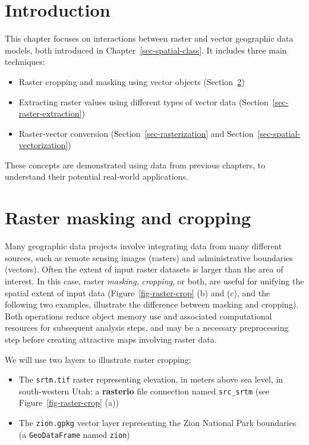 \documentclass[
  letterpaper,
]{krantz}
\providecommand{\tightlist}{%
  \setlength{\itemsep}{0pt}\setlength{\parskip}{0pt}}\usepackage{longtable,booktabs,array}
\begin{document}
\section{Introduction}\label{introduction-4}

This chapter focuses on interactions between raster and vector
geographic data models, both introduced in
Chapter~\ref{sec-spatial-class}. It includes three main techniques:

\begin{itemize}
\tightlist
\item
  Raster cropping and masking using vector objects
  (Section~\ref{sec-raster-cropping})
\item
  Extracting raster values using different types of vector data
  (Section~\ref{sec-raster-extraction})
\item
  Raster-vector conversion (Section~\ref{sec-rasterization} and
  Section~\ref{sec-spatial-vectorization})
\end{itemize}

These concepts are demonstrated using data from previous chapters, to
understand their potential real-world applications.

\section{Raster masking and cropping}\label{sec-raster-cropping}

Many geographic data projects involve integrating data from many
different sources, such as remote sensing images (rasters) and
administrative boundaries (vectors). Often the extent of input raster
datasets is larger than the area of interest. In this case, raster
\emph{masking}, \emph{cropping}, or both, are useful for unifying the
spatial extent of input data (Figure~\ref{fig-raster-crop} (b) and (c),
and the following two examples, illustrate the difference between
masking and cropping). Both operations reduce object memory use and
associated computational resources for subsequent analysis steps, and
may be a necessary preprocessing step before creating attractive maps
involving raster data.

We will use two layers to illustrate raster cropping:

\begin{itemize}
\tightlist
\item
  The \texttt{srtm.tif} raster representing elevation, in meters above
  sea level, in south-western Utah: a \textbf{rasterio} file connection
  named \texttt{src\_srtm} (see Figure~\ref{fig-raster-crop} (a))
\item
  The \texttt{zion.gpkg} vector layer representing the Zion National
  Park boundaries (a \texttt{GeoDataFrame} named \texttt{zion})
\end{itemize}
\end{document}
